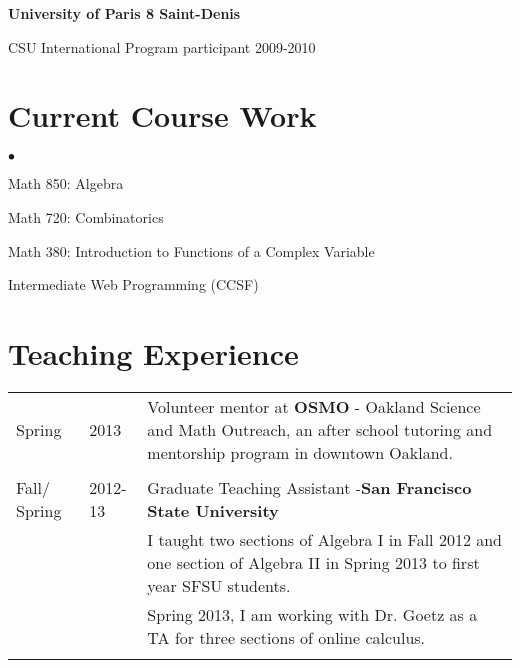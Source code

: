 \documentclass[margin,line,pifont,palatino,courier]{res}
\newenvironment{list1}{
  \begin{list}{\ding{113}}{%
      \setlength{\itemsep}{0in}
      \setlength{\parsep}{0in} \setlength{\parskip}{0in}
      \setlength{\topsep}{0in} \setlength{\partopsep}{0in}
      \setlength{\leftmargin}{0.17in}}}{\end{list}}
\newenvironment{list2}{
  \begin{list}{$\bullet$}{%
      \setlength{\itemsep}{0in}
      \setlength{\parsep}{0in} \setlength{\parskip}{0in}
      \setlength{\topsep}{0in} \setlength{\partopsep}{0in}
      \setlength{\leftmargin}{0.2in}}}{\end{list}}
\begin{document}
\begin{resume}
\begin{list1}
\item {\bf University of Paris 8 Saint-Denis}


CSU International Program participant 2009-2010


\end{list1}
 
 \section{\sc Current Course Work}
 \begin{list2}
 \item Math 850: Algebra
 \item Math 720: Combinatorics
 \item Math 380: Introduction to Functions of a Complex Variable
 \item Intermediate Web Programming (CCSF) 
 
 \end{list2}
 
 
 
 
\section{\sc Teaching Experience}

\begin{tabular}{@{}p{0.75in}p{0.5in}p{4in}}
Spring & 2013 & Volunteer mentor at {\bf OSMO} - Oakland Science and Math Outreach, an after school tutoring and mentorship program  in downtown Oakland. \\ \\


Fall/ Spring & 2012-13  & Graduate Teaching Assistant -{\bf San Francisco State University }  \\
  & 			& 	I taught two sections of Algebra I in Fall 2012  and one section of Algebra II  in Spring 2013 to first year SFSU students.  \\
  		& &      Spring 2013, I am working with Dr. Goetz as a TA for three sections of online calculus.   \\  \\
  				




\end{tabular}
\end{resume}
\end{document}
